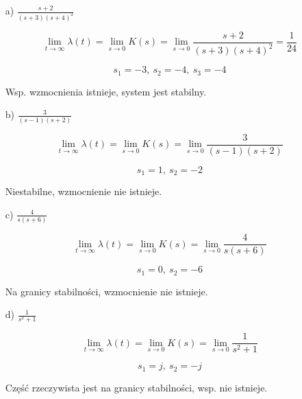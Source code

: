 \documentclass{article}
\begin{document}
\begin{itemize}
    \item[a)] $\frac{s+2}{(s+3)(s+4)^{2}}$
     
        $$\lim\limits_{t \to \infty} \lambda(t)=\lim\limits_{s \to 0} K(s)=
        \lim\limits_{s \to 0} \frac{s+2}{(s+3)(s+4)^{2}}=\frac{1}{24}$$

        $$ s_{1}=-3, \ s_{2}=-4, \ s_{3}=-4 $$

        Wsp. wzmocnienia istnieje, system jest stabilny.

    \item[b)] $\frac{3}{(s-1)(s+2)}$
    
        $$\lim\limits_{t \to \infty} \lambda(t)=\lim\limits_{s \to 0} K(s)=
        \lim\limits_{s \to 0} \frac{3}{(s-1)(s+2)}$$

        $$ s_{1}=1, \ s_{2}=-2$$
        
        Niestabilne, wzmocnienie nie istnieje.

    \item[c)] $ \frac{4}{s(s+6)} $
    
        $$\lim\limits_{t \to \infty} \lambda(t)=\lim\limits_{s \to 0} K(s)=
        \lim\limits_{s \to 0} \frac{4}{s(s+6)}$$

        $$ s_{1}=0, \ s_{2}=-6 $$

        Na granicy stabilności, wzmocnienie nie istnieje.

    \item[d)] $\frac{1}{s^{2}+1}$  

        $$\lim\limits_{t \to \infty} \lambda(t)=\lim\limits_{s \to 0} K(s)=
        \lim\limits_{s \to 0} \frac{1}{s^{2}+1}$$

        $$ s_{1}=j, \ s_{2}=-j $$

        Część rzeczywista jest na granicy stabilności, wsp. nie istnieje.

    \end{itemize}
\end{document}
